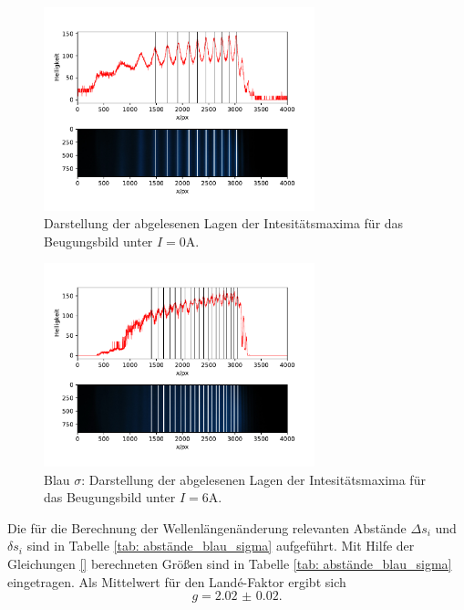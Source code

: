\begin{figure}
  \centering
  \includegraphics[width = 0.7\textwidth]{../Messdaten/plots/peaks_blau_sigma_0.pdf}
  \caption{Darstellung der abgelesenen Lagen der Intesitätsmaxima für das Beugungsbild unter $I =0$A.}
  \label{fig: peaks_blau_0}
\end{figure}
\begin{figure}
  \centering
  \includegraphics[width = 0.7\textwidth]{../Messdaten/plots/peaks_blau_sigma_6.pdf}
  \caption{Blau $\sigma$: Darstellung der abgelesenen Lagen der Intesitätsmaxima für das Beugungsbild unter $I =6$A.}
  \label{fig: peaks_blau_sigma_6}
\end{figure}
Die für die Berechnung der Wellenlängenänderung relevanten Abstände $\Delta s_i$ und $\delta s_i$ sind in Tabelle \ref{tab: abstände_blau_sigma}
aufgeführt. Mit Hilfe der Gleichungen \eqref{} berechneten Größen sind in Tabelle
\ref{tab: abstände_blau_sigma} eingetragen. Als Mittelwert für den Landé-Faktor ergibt sich
\begin{equation}
  g = \num{2.02(2)}.
\end{equation}

